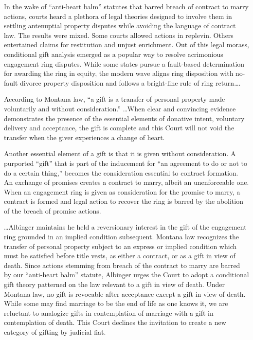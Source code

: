In the wake of ``anti-heart balm'' statutes that barred breach of contract to
marry actions, courts heard a plethora of legal theories designed to involve
them in settling antenuptial property disputes while avoiding the language of
contract law. The results were mixed. Some courts allowed actions in replevin.
Others entertained claims for restitution and unjust enrichment. Out of this
legal morass, conditional gift analysis emerged as a popular way to resolve
acrimonious engagement ring disputes. While some states pursue a fault-based
determination for awarding the ring in equity, the modern wave aligns ring
disposition with no-fault divorce property disposition and follows a
bright-line rule of ring return\dots.


According to Montana law, ``a gift is a transfer of personal property made
voluntarily and without consideration.'' \dots When clear and convincing
evidence demonstrates the presence of the essential elements of donative
intent, voluntary delivery and acceptance, the gift is complete and this Court
will not void the transfer when the giver experiences a change of heart. 

Another essential element of a gift is that it is given without consideration. A
purported ``gift'' that is part of the inducement for ``an agreement to do or
not to do a certain thing,'' becomes the consideration essential to contract
formation. An exchange of promises creates a contract to marry, albeit an
unenforceable one. When an engagement ring is given as consideration for the
promise to marry, a contract is formed and legal action to recover the ring is
barred by the abolition of the breach of promise actions.

\dots Albinger maintains he held a reversionary interest in the gift of the
engagement ring grounded in an implied condition subsequent. Montana law
recognizes the transfer of personal property subject to an express or implied
condition which must be satisfied before title vests, as either a contract, or
as a gift in view of death. Since actions stemming from breach of the contract
to marry are barred by our ``anti-heart balm'' statute, Albinger urges the
Court to adopt a conditional gift theory patterned on the law relevant to a
gift in view of death. Under Montana law, no gift is revocable after acceptance
except a gift in view of death. While some may find marriage to be the end of
life as one knows it, we are reluctant to analogize gifts in contemplation of
marriage with a gift in contemplation of death. This Court declines the
invitation to create a new category of gifting by judicial fiat.

